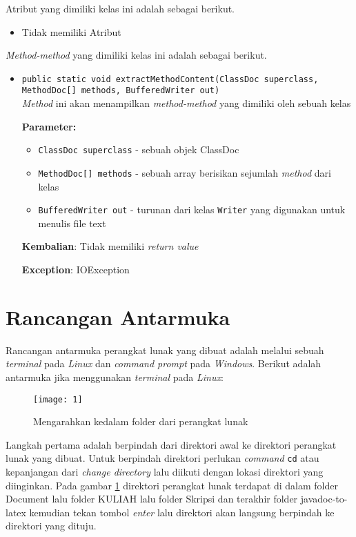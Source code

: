 \begin{enumerate}
Atribut yang dimiliki kelas ini adalah sebagai berikut.
\begin{itemize}
\item Tidak memiliki Atribut
\end{itemize}
\textit{Method-method} yang dimiliki kelas ini adalah sebagai berikut.
\begin{itemize}
\item \texttt{public static void extractMethodContent(ClassDoc superclass, MethodDoc[] methods, BufferedWriter out)}\\ 
\textit{Method} ini akan menampilkan {\it method-method} yang dimiliki oleh sebuah kelas

\textbf{Parameter:}
\begin{itemize}
\item \texttt{ClassDoc superclass} - 
sebuah objek ClassDoc
\item \texttt{MethodDoc[] methods} - 
sebuah array berisikan sejumlah \textit{method} dari kelas
\item \texttt{BufferedWriter out} - 
turunan dari kelas \texttt{Writer} yang digunakan untuk menulis file text
\end{itemize}
\textbf{Kembalian}: Tidak memiliki \textit{return value}

\textbf{Exception}: IOException

\end{itemize}
\end{enumerate}

\section{Rancangan Antarmuka}
\label{sec:antarmuka}
Rancangan antarmuka perangkat lunak yang dibuat adalah melalui sebuah {\it terminal} pada {\it Linux} dan {\it command prompt} pada {\it Windows}. Berikut adalah antarmuka jika menggunakan {\it terminal} pada {\it Linux}: 

\begin{figure}[H]
	\centering  
	\texttt{[image: 1]}  
	\caption[Kelas Diagram]{Mengarahkan kedalam folder dari perangkat lunak} 
	\label{fig:1} 
\end{figure}
Langkah pertama adalah berpindah dari direktori awal ke direktori perangkat lunak yang dibuat. Untuk berpindah direktori perlukan {\it command} \texttt{cd} atau kepanjangan dari {\it change directory} lalu diikuti dengan lokasi direktori yang diinginkan. Pada gambar \ref{fig:1} direktori perangkat lunak terdapat di dalam folder Document lalu folder KULIAH lalu folder Skripsi dan terakhir folder javadoc-to-latex kemudian tekan tombol {\it enter} lalu direktori akan langsung berpindah ke direktori yang dituju.

